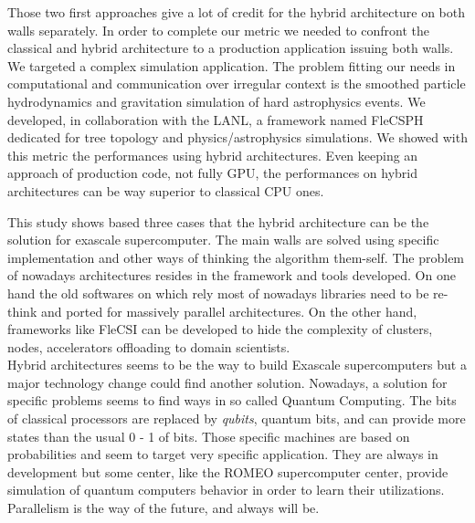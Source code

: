 Those two first approaches give a lot of credit for the hybrid architecture on both walls separately. 
In order to complete our metric we needed to confront the classical and hybrid architecture to a production application issuing both walls. 
We targeted a complex simulation application. 
The problem fitting our needs in computational and communication over irregular context is the smoothed particle hydrodynamics and gravitation simulation of hard astrophysics events. 
We developed, in collaboration with the LANL, a framework named FleCSPH dedicated for tree topology and physics/astrophysics simulations. 
We showed with this metric the performances using hybrid architectures. 
Even keeping an approach of production code, not fully GPU, the performances on hybrid architectures can be way superior to classical CPU ones. 

This study shows based three cases that the hybrid architecture can be the solution for exascale supercomputer.
The main walls are solved using specific implementation and other ways of thinking the algorithm them-self. 
The problem of nowadays architectures resides in the framework and tools developed. 
On one hand the old softwares on which rely most of nowadays libraries need to be re-think and ported for massively parallel architectures. 
On the other hand, frameworks like FleCSI can be developed to hide the complexity of clusters, nodes, accelerators offloading to domain scientists.\\

Hybrid architectures seems to be the way to build Exascale supercomputers but a major technology change could find another solution. 
Nowadays, a solution for specific problems seems to find ways in so called Quantum Computing.
The bits of classical processors are replaced by \textit{qubits}, quantum bits, and can provide more states than the usual 0 - 1 of bits.
Those specific machines are based on probabilities and seem to target very specific application. 
They are always in development but some center, like the ROMEO supercomputer center, provide simulation of quantum computers behavior in order to learn their utilizations.\\

Parallelism is the way of the future, and always will be. 